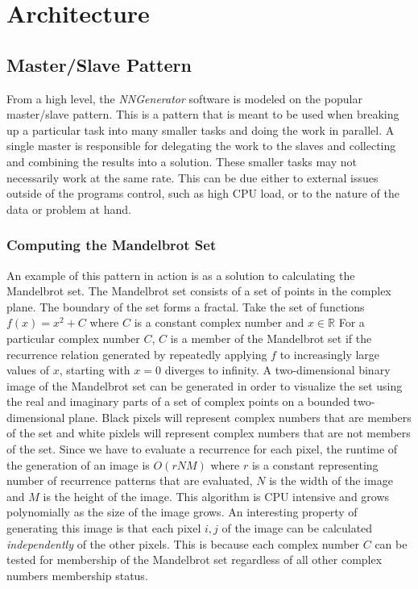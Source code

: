 \chapter[Architecture]{Architecture}

\section{Master/Slave Pattern}
From a high level, the {\em NNGenerator} software is modeled on the popular master/slave pattern. 
This is a pattern that is meant to be used when breaking up a particular task into many smaller tasks and doing the work in parallel.
A single master is responsible for delegating the work to the slaves and collecting and combining the results into a solution.
These smaller tasks may not necessarily work at the same rate.
This can be due either to external issues outside of the programs control, such as high CPU load, or to the nature of the data or problem at hand.

\subsection{Computing the Mandelbrot Set}
An example of this pattern in action is as a solution to calculating the Mandelbrot set.
The Mandelbrot set consists of a set of points in the complex plane. The boundary of the set forms a fractal.
Take the set of functions $f(x)=x^2 + C$ where $C$ is a constant complex number
and $x \in \mathbb{R}$ 
For a particular complex number $C$, $C$ is a member of the Mandelbrot set if
the recurrence relation generated by repeatedly applying $f$ to increasingly large values of $x$, starting with $x=0$ diverges to infinity. 
A two-dimensional binary image of the Mandelbrot set can be generated in order to visualize the set using the real and imaginary parts of a set of 
complex points on a bounded two-dimensional plane. 
Black pixels will represent complex numbers that are members of the set and white pixlels will represent complex numbers that are not members of the set.
Since we have to evaluate a recurrence for each pixel, the runtime of the generation of an image is $O(rNM)$ where $r$ is a constant representing number of recurrence patterns that are evaluated, $N$ is the width of the image and $M$ is the height of the image.
This algorithm is CPU intensive and grows polynomially as the size of the image grows. 
An interesting property of generating this image is that each pixel
$i,j$ of the image can be calculated {\it independently} of the other pixels.
This is because each complex number $C$ can be tested for membership of the Mandelbrot set regardless of all other complex numbers membership status.
 
